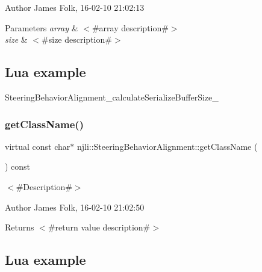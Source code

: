 \begin{DoxyAuthor}{Author}
James Folk, 16-\/02-\/10 21\+:02\+:13
\end{DoxyAuthor}

\begin{DoxyParams}{Parameters}
{\em array} & $<$\#array description\#$>$ \\
\hline
{\em size} & $<$\#size description\#$>$\\
\hline
\end{DoxyParams}
\hypertarget{classnjli_1_1_steering_behavior_wander_ex1}{}\subsection{Lua example}\label{classnjli_1_1_steering_behavior_wander_ex1}

\begin{DoxyCodeInclude}
\end{DoxyCodeInclude}
Steering\+Behavior\+Alignment\+\_\+calculate\+Serialize\+Buffer\+Size\+\_\+ \mbox{\label{classnjli_1_1_steering_behavior_alignment_a6cbba499c35513f2e890496d5e70467a}} 
\subsubsection{\texorpdfstring{get\+Class\+Name()}{getClassName()}}
{\footnotesize\ttfamily virtual const char$\ast$ njli\+::\+Steering\+Behavior\+Alignment\+::get\+Class\+Name (\begin{DoxyParamCaption}{ }\end{DoxyParamCaption}) const\hspace{0.3cm}{\ttfamily [virtual]}}



$<$\#\+Description\#$>$ 

\begin{DoxyAuthor}{Author}
James Folk, 16-\/02-\/10 21\+:02\+:50
\end{DoxyAuthor}
\begin{DoxyReturn}{Returns}
$<$\#return value description\#$>$
\end{DoxyReturn}
\hypertarget{classnjli_1_1_steering_behavior_wander_ex1}{}\subsection{Lua example}\label{classnjli_1_1_steering_behavior_wander_ex1}


